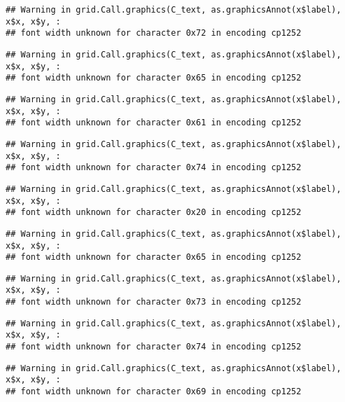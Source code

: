 \documentclass[
]{article}
\begin{document}
\begin{verbatim}
## Warning in grid.Call.graphics(C_text, as.graphicsAnnot(x$label), x$x, x$y, :
## font width unknown for character 0x72 in encoding cp1252
\end{verbatim}

\begin{verbatim}
## Warning in grid.Call.graphics(C_text, as.graphicsAnnot(x$label), x$x, x$y, :
## font width unknown for character 0x65 in encoding cp1252
\end{verbatim}

\begin{verbatim}
## Warning in grid.Call.graphics(C_text, as.graphicsAnnot(x$label), x$x, x$y, :
## font width unknown for character 0x61 in encoding cp1252
\end{verbatim}

\begin{verbatim}
## Warning in grid.Call.graphics(C_text, as.graphicsAnnot(x$label), x$x, x$y, :
## font width unknown for character 0x74 in encoding cp1252
\end{verbatim}

\begin{verbatim}
## Warning in grid.Call.graphics(C_text, as.graphicsAnnot(x$label), x$x, x$y, :
## font width unknown for character 0x20 in encoding cp1252
\end{verbatim}

\begin{verbatim}
## Warning in grid.Call.graphics(C_text, as.graphicsAnnot(x$label), x$x, x$y, :
## font width unknown for character 0x65 in encoding cp1252
\end{verbatim}

\begin{verbatim}
## Warning in grid.Call.graphics(C_text, as.graphicsAnnot(x$label), x$x, x$y, :
## font width unknown for character 0x73 in encoding cp1252
\end{verbatim}

\begin{verbatim}
## Warning in grid.Call.graphics(C_text, as.graphicsAnnot(x$label), x$x, x$y, :
## font width unknown for character 0x74 in encoding cp1252
\end{verbatim}

\begin{verbatim}
## Warning in grid.Call.graphics(C_text, as.graphicsAnnot(x$label), x$x, x$y, :
## font width unknown for character 0x69 in encoding cp1252
\end{verbatim}
\end{document}
